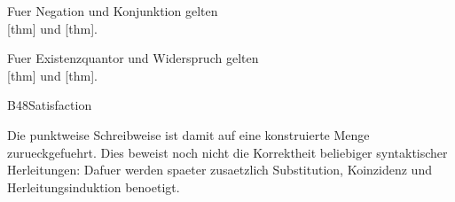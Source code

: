 Fuer Negation und Konjunktion gelten\\
[thm] und [thm].

Fuer Existenzquantor und Widerspruch gelten\\
[thm] und [thm].

{B48Satisfaction}{
}

Die punktweise Schreibweise ist damit auf eine konstruierte Menge
zurueckgefuehrt. Dies beweist noch nicht die Korrektheit beliebiger
syntaktischer Herleitungen: Dafuer werden spaeter zusaetzlich
Substitution, Koinzidenz und Herleitungsinduktion benoetigt.
